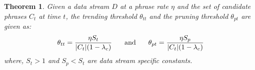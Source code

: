 \documentclass{sig-alternate}
\newtheorem{theorem}{Theorem}[section]
\begin{document}
\begin{theorem}
Given a data stream $D$ at a phrase rate $\eta$ and the set of candidate phrases $C_t$ at time $t$, the trending threshold $\theta_{tt}$ and the pruning threshold $\theta_{pt}$ are given as:
\begin{align*}
\theta_{tt} = \frac{\eta S_t}{|C_t|(1-\lambda_c)} \hspace{0.2in} \text{ and } \hspace{0.2in} \theta_{pt} = \frac{\eta S_p}{|C_t|(1-\lambda_c)}
\end{align*}
where, $S_t > 1$ and $S_p < S_t$ are data stream specific constants.
\label{the:threshold}
\end{theorem}
\end{document}

